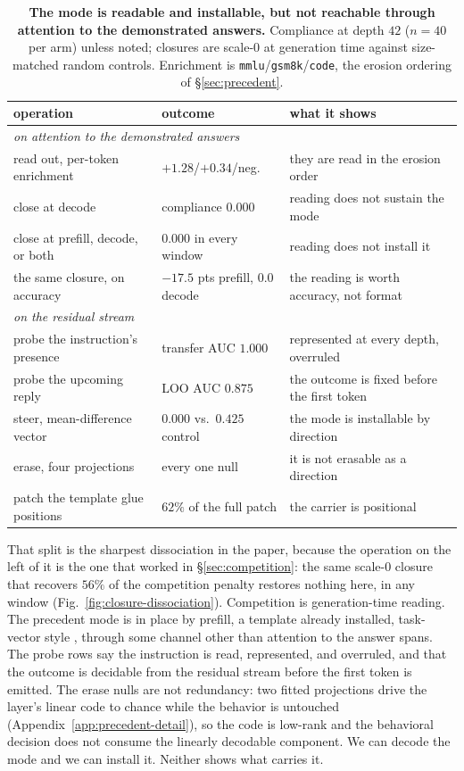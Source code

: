 \documentclass{article}
\begin{document}
\begin{table}[t]
  \centering\small
  \caption{\textbf{The mode is readable and installable, but not reachable through attention
  to the demonstrated answers.} Compliance at depth $42$ ($n{=}40$ per arm) unless noted;
  closures are scale-$0$ at generation time against size-matched random controls.
  Enrichment is \texttt{mmlu}/\texttt{gsm8k}/\texttt{code}, the erosion ordering of \S\ref{sec:precedent}.}
  \label{tab:mode}
  \setlength{\tabcolsep}{4pt}
  \begin{tabular}{lll}
    \toprule
    operation & outcome & what it shows\\
    \midrule
    \multicolumn{3}{l}{\textit{on attention to the demonstrated answers}}\\
    read out, per-token enrichment & $+1.28$/$+0.34$/neg. & they are read in the erosion order\\
    close at decode & compliance $0.000$ & reading does not sustain the mode\\
    close at prefill, decode, or both & $0.000$ in every window & reading does not install it\\
    the same closure, on accuracy & $-17.5$ pts prefill, $0.0$ decode & the reading is worth accuracy, not format\\
    \midrule
    \multicolumn{3}{l}{\textit{on the residual stream}}\\
    probe the instruction's presence & transfer AUC $1.000$ & represented at every depth, overruled\\
    probe the upcoming reply & LOO AUC $0.875$ & the outcome is fixed before the first token\\
    steer, mean-difference vector & $0.000$ vs.\ $0.425$ control & the mode is installable by direction\\
    erase, four projections & every one null & it is not erasable as a direction\\
    patch the template glue positions & $62\%$ of the full patch & the carrier is positional\\
    \bottomrule
  \end{tabular}
\end{table}

That split is the sharpest dissociation in the paper, because the operation on the left of it
is the one that worked in \S\ref{sec:competition}: the same scale-$0$ closure that recovers
$56\%$ of the competition penalty restores nothing here, in any window
(Fig.~\ref{fig:closure-dissociation}). Competition is generation-time reading. The precedent
mode is in place by prefill, a template already installed, task-vector style
\citep{hendel2023taskvectors}, through some channel other than attention to the answer spans.
The probe rows say the instruction is read, represented, and overruled, and that the outcome
is decidable from the residual stream before the first token is emitted. The erase nulls are
not redundancy: two fitted projections drive the layer's linear code to chance while the
behavior is untouched (Appendix~\ref{app:precedent-detail}), so the code is low-rank and the
behavioral decision does not consume the linearly decodable component. We can decode the mode
and we can install it. Neither shows what carries it.
\end{document}
